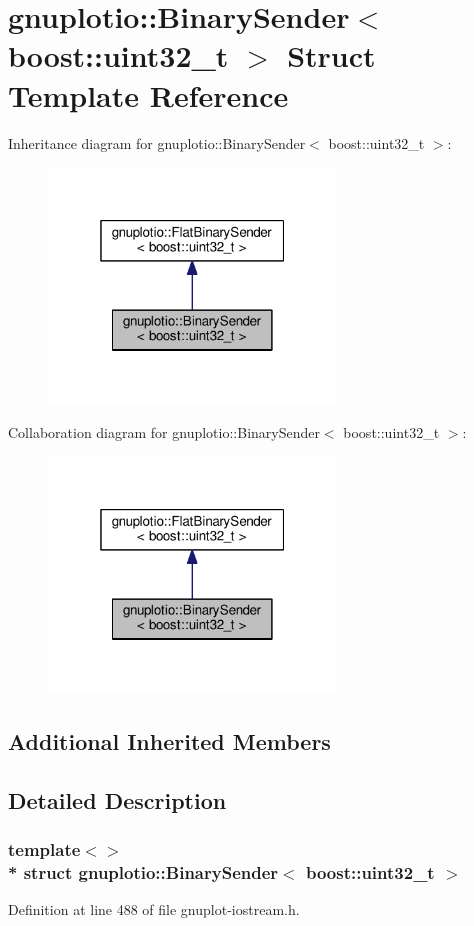 \hypertarget{structgnuplotio_1_1_binary_sender_3_01boost_1_1uint32__t_01_4}{}\section{gnuplotio\+:\+:Binary\+Sender$<$ boost\+:\+:uint32\+\_\+t $>$ Struct Template Reference}
\label{structgnuplotio_1_1_binary_sender_3_01boost_1_1uint32__t_01_4}


Inheritance diagram for gnuplotio\+:\+:Binary\+Sender$<$ boost\+:\+:uint32\+\_\+t $>$\+:\nopagebreak
\begin{figure}[H]
\begin{center}
\leavevmode
\includegraphics[width=217pt]{structgnuplotio_1_1_binary_sender_3_01boost_1_1uint32__t_01_4__inherit__graph}
\end{center}
\end{figure}


Collaboration diagram for gnuplotio\+:\+:Binary\+Sender$<$ boost\+:\+:uint32\+\_\+t $>$\+:\nopagebreak
\begin{figure}[H]
\begin{center}
\leavevmode
\includegraphics[width=217pt]{structgnuplotio_1_1_binary_sender_3_01boost_1_1uint32__t_01_4__coll__graph}
\end{center}
\end{figure}
\subsection*{Additional Inherited Members}


\subsection{Detailed Description}
\subsubsection*{template$<$$>$\\*
struct gnuplotio\+::\+Binary\+Sender$<$ boost\+::uint32\+\_\+t $>$}



Definition at line 488 of file gnuplot-\/iostream.\+h.

